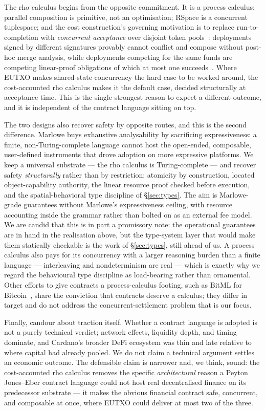 \documentclass[11pt]{article}
\theoremstyle{definition}
\theoremstyle{plain}
\begin{document}
The rho calculus begins from the opposite commitment. It is a process calculus; parallel composition
is primitive, not an optimisation; RSpace is a concurrent tuplespace; and the cost construction's
governing motivation is to replace run-to-completion with \emph{concurrent acceptance} over disjoint
token pools~\cite[\S2]{CAR2026}: deployments signed by different signatures provably cannot conflict
and compose without post-hoc merge analysis, while deployments competing for the same funds are
competing linear-proof obligations of which at most one succeeds~\cite[\S8.8]{CAR2026}. Where EUTXO
makes shared-state concurrency the hard case to be worked around, the cost-accounted rho calculus
makes it the default case, decided structurally at acceptance time. This is the single strongest
reason to expect a different outcome, and it is independent of the contract language sitting on top.

The two designs also recover safety by opposite routes, and this is the second difference. Marlowe
buys exhaustive analysability by sacrificing expressiveness: a finite, non-Turing-complete language
cannot host the open-ended, composable, user-defined instruments that drove adoption on more
expressive platforms. We keep a universal substrate --- the rho calculus is Turing-complete --- and
recover safety \emph{structurally} rather than by restriction: atomicity by construction, located
object-capability authority, the linear resource proof checked before execution, and the
spatial-behavioral type discipline of \S\ref{sec:types}. The aim is Marlowe-grade guarantees without
Marlowe's expressiveness ceiling, with resource accounting inside the grammar rather than bolted on as
an external fee model. We are candid that this is in part a promissory note: the operational
guarantees are in hand in the realisation above, but the type-system layer that would make them
statically checkable is the work of \S\ref{sec:types}, still ahead of us. A process calculus also pays
for its concurrency with a larger reasoning burden than a finite language --- interleaving and
nondeterminism are real --- which is exactly why we regard the behavioural type discipline as
load-bearing rather than ornamental. Other efforts to give contracts a process-calculus footing, such
as BitML for Bitcoin~\cite{BartolettiZunino2018}, share the conviction that contracts deserve a
calculus; they differ in target and do not address the concurrent-settlement problem that is our focus.

Finally, candour about traction itself. Whether a contract language is adopted is not a purely
technical verdict; network effects, liquidity depth, and timing dominate, and Cardano's broader DeFi
ecosystem was thin and late relative to where capital had already pooled. We do not claim a technical
argument settles an economic outcome. The defensible claim is narrower and, we think, sound: the
cost-accounted rho calculus removes the specific \emph{architectural} reason a Peyton Jones--Eber
contract language could not host real decentralised finance on its predecessor substrate --- it makes
the obvious financial contract safe, concurrent, and composable at once, where EUTXO could deliver at
most two of the three.
\end{document}
